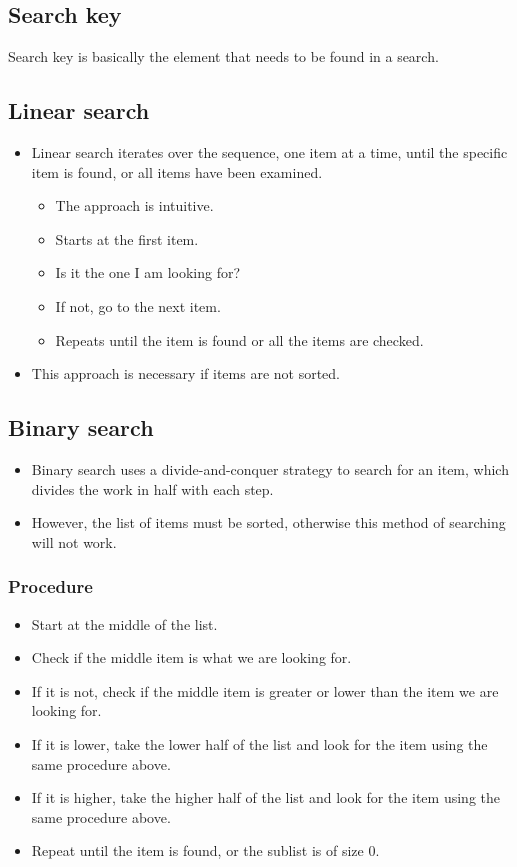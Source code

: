 \documentclass[11pt]{article}
\begin{document}
\subsection{Search key}
\label{sec:org383fcba}
Search key is basically the element that needs to be found in a search.

\subsection{Linear search}
\label{sec:org72e5ec6}
\begin{itemize}
\item Linear search iterates over the sequence, one item at a time, until the specific item is found, or all items have been examined.
\begin{itemize}
\item The approach is intuitive.
\item Starts at the first item.
\item Is it the one I am looking for?
\item If not, go to the next item.
\item Repeats until the item is found or all the items are checked.
\end{itemize}

\item This approach is necessary if items are not sorted.
\end{itemize}

 \newpage

\subsection{Binary search}
\label{sec:org17676c3}
\begin{itemize}
\item Binary search uses a divide-and-conquer strategy to search for an item, which divides the work in half with each step.
\item However, the list of items must be sorted, otherwise this method of searching will not work.
\end{itemize}

\subsubsection{Procedure}
\label{sec:orgd5d48ba}
\begin{itemize}
\item Start at the middle of the list.
\item Check if the middle item is what we are looking for.
\item If it is not, check if the middle item is greater or lower than the item we are looking for.
\item If it is lower, take the lower half of the list and look for the item using the same procedure above.
\item If it is higher, take the higher half of the list and look for the item using the same procedure above.
\item Repeat until the item is found, or the sublist is of size 0.
\end{itemize}
\end{document}
